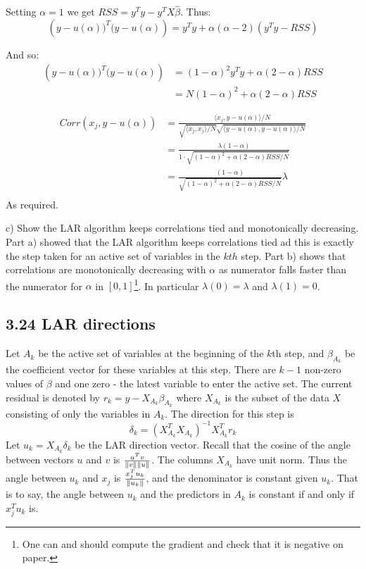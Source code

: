 Setting $\alpha = 1$ we get $RSS = y^T y - y^T X\hat{\beta}$.
Thus: $$\left(y - u(\alpha))^T (y - u(\alpha)\right) =  y^T y + \alpha( \alpha - 2) (y^T y - RSS)$$

And so:
\begin{align*}
\left(y - u(\alpha))^T (y - u(\alpha)\right) &=  (1 - \alpha)^2 y^T y + \alpha(2 - \alpha) RSS \\
&=  N (1 - \alpha)^2  + \alpha(2 - \alpha) RSS 
\end{align*} 

\begin{align*}
    Corr\left(x_j, y - u(\alpha)\right) &= \frac{\langle x_j, y - u(\alpha)\rangle / N}{\sqrt{\langle x_j, x_j \rangle / N}{\sqrt{\langle y - u(\alpha), y - u(\alpha) \rangle / N}}}\\
    &= \frac{\lambda (1 - \alpha)}{1\cdot{\sqrt{(1 - \alpha)^2  + \alpha(2 - \alpha) RSS / N} }}\\
    &= \frac{(1 - \alpha)}{{\sqrt{(1 - \alpha)^2  + \alpha(2 - \alpha) RSS / N} }} \lambda \\
\end{align*}
As required.

c) Show the LAR algorithm keeps correlations tied and monotonically decreasing.\\

Part a) showed that the LAR algorithm keeps correlations tied ad this is exactly the step taken for an active set of variables in the $kth$ step.
Part b) shows that correlations are monotonically decreasing with $\alpha$ as numerator falls  faster than the numerator for $\alpha$ in $[0,1]$\footnote{One can and should compute the gradient and check that it is negative on paper.}. In particular $\lambda(0) = \lambda$ and $\lambda(1) = 0$.

 





\subsection*{3.24 LAR directions}

Let $A_k$ be the active set of variables at the beginning of the $k$th step, and $\beta_{A_k}$ be the coefficient vector for these variables at this step. There are $k-1$ non-zero values of $\beta$ and one zero - the latest variable to enter the active set.
The current residual is denoted by $r_k = y - X_{A_k} \beta_{A_k}$ where $X_{A_k}$ is the subset of the data $X$ consisting of only the variables in $A_k$.
The direction for this step is 
$$\delta_k = \left(X_{A_k}^T X_{A_k}\right)^{-1} X_{A_k}^T r_k $$
Let $u_k = X_{A_k} \delta_k$ be the LAR direction vector.
Recall that the cosine of the angle between vectors $u$ and $v$ is $\frac{u^T v}{\left\lVert v\right\rVert\left\lVert u\right\rVert}$.
The columns $X_{A_k}$ have unit norm.
Thus the angle between $u_k$ and $x_j$ is $\frac{x_j^T u_k}{\left\lVert u_k\right\rVert}$, and the denominator is constant given $u_k$.
That is to say, the angle between $u_k$ and the predictors in $A_k$ is constant if and only if $x_j^T u_k$ is.

